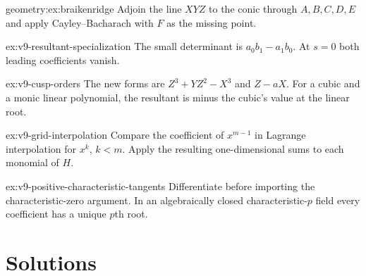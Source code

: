 \begin{hint}{geometry:ex:braikenridge}
Adjoin the line $XYZ$ to the conic through $A,B,C,D,E$ and apply Cayley--Bacharach with $F$ as the missing point.
\end{hint}
\begin{hint}{ex:v9-resultant-specialization}
The small determinant is $a_0b_1-a_1b_0$. At $s=0$ both leading coefficients vanish.
\end{hint}
\begin{hint}{ex:v9-cusp-orders}
The new forms are $Z^3+YZ^2-X^3$ and $Z-aX$. For a cubic and a monic linear polynomial, the resultant is minus the cubic's value at the linear root.
\end{hint}
\begin{hint}{ex:v9-grid-interpolation}
Compare the coefficient of $x^{m-1}$ in Lagrange interpolation for $x^k$, $k<m$. Apply the resulting one-dimensional sums to each monomial of $H$.
\end{hint}
\begin{hint}{ex:v9-positive-characteristic-tangents}
Differentiate before importing the characteristic-zero argument. In an algebraically closed characteristic-$p$ field every coefficient has a unique $p$th root.
\end{hint}

\section{Solutions}

